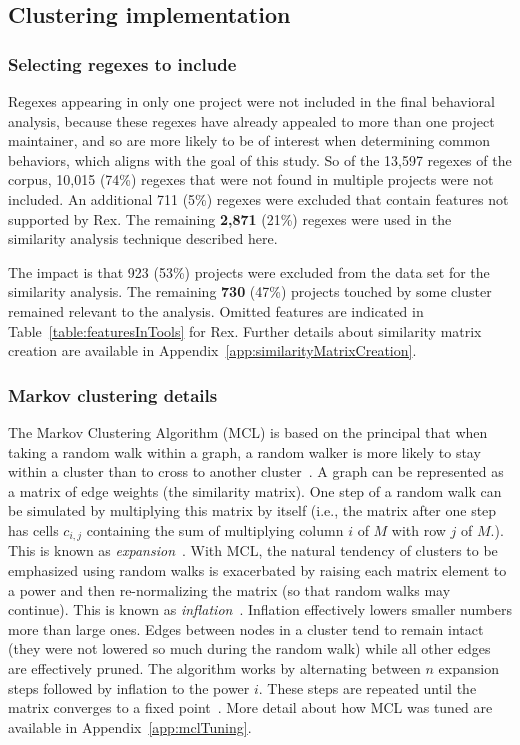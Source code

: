 \subsection{Clustering implementation}
\label{sec:clusteringImplementation}

\subsubsection{Selecting regexes to include}
Regexes appearing in only one project were not included in the final behavioral analysis, because these regexes have already appealed to more than one project maintainer, and so are more likely to be of interest when determining common behaviors, which aligns with the goal of this study.  So of the 13,597 regexes of the corpus, 10,015 (74\%) regexes that were not found in multiple projects were not included.
An additional 711 (5\%) regexes were excluded that contain features not supported by Rex.  The remaining \textbf{2,871} (21\%) regexes were used in the similarity analysis technique described here.

The impact is that 923 (53\%) projects were excluded from the data set for the similarity analysis.  The remaining \textbf{730} (47\%) projects touched by some cluster remained relevant to the analysis. Omitted features are indicated in Table~\ref{table:featuresInTools} for Rex.  Further details about similarity matrix creation are available in Appendix~\ref{app:similarityMatrixCreation}.

\subsubsection{Markov clustering details}
The Markov Clustering Algorithm (MCL) is based on the principal that when taking a random walk within a graph, a random walker is more likely to stay within a cluster than to cross to another cluster~.  A graph can be represented as a matrix of edge weights (the similarity matrix).  One step of a random walk can be simulated by multiplying this matrix by itself (i.e., the matrix after one step has cells $c_{i,j}$ containing the sum of multiplying column $i$ of $M$ with row $j$ of $M$.).  This is known as \emph{expansion}~.  With MCL, the natural tendency of clusters to be emphasized using random walks is exacerbated by raising each matrix element to a power and then re-normalizing the matrix (so that random walks may continue).  This is known as \emph{inflation}~.  Inflation effectively lowers smaller numbers more than large ones.  Edges between nodes in a cluster tend to remain intact (they were not lowered so much during the random walk) while all other edges are effectively pruned.  The algorithm works by alternating between $n$ expansion steps followed by inflation to the power $i$.  These steps are repeated until the matrix converges to a fixed point~.  More detail about how MCL was tuned are available in Appendix~\ref{app:mclTuning}.
